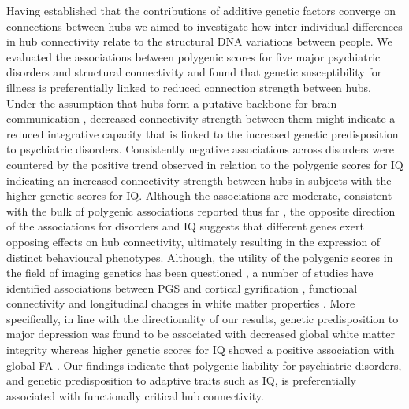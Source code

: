 Having established that the contributions of additive genetic factors converge on connections between hubs we aimed to investigate how inter-individual differences in hub connectivity relate to the structural DNA variations between people. We evaluated the associations between polygenic scores for five major psychiatric disorders and structural connectivity and found that genetic susceptibility for illness is preferentially linked to reduced connection strength between hubs. Under the assumption that hubs form a putative backbone for brain communication \citep{Harriger2012,Towlson2013,VandenHeuvel2011,VandenHeuvel2013b}, decreased connectivity strength between them might indicate a reduced integrative capacity that is linked to the increased genetic predisposition to psychiatric disorders. Consistently negative associations across disorders were countered by the positive trend observed in relation to the polygenic scores for IQ indicating an increased connectivity strength between hubs in subjects with the higher genetic scores for IQ. Although the associations are moderate, consistent with the bulk of polygenic associations reported thus far \citep{Alloza2018,Dezhina2018,Liu2016a,Sadeh2018,Wang2017}, the opposite direction of the associations for disorders and IQ suggests that different genes exert opposing effects on hub connectivity, ultimately resulting in the expression of distinct behavioural phenotypes. Although, the utility of the polygenic scores in the field of imaging genetics has been questioned \citep{Reus2017}, a number of studies have identified associations between PGS and cortical gyrification \citep{Liu2016a}, functional connectivity \citep{Dezhina2018,Sadeh2018,Wang2017} and longitudinal changes in white matter properties \citep{Alloza2018}. More specifically, in line with the directionality of our results, genetic predisposition to major depression was found to be associated with decreased global white matter integrity \citep{Whalley2013} whereas higher genetic scores for IQ showed a positive association with global FA \citep{Jansen2018}. Our findings indicate that polygenic liability for psychiatric disorders, and genetic predisposition to adaptive traits such as IQ, is preferentially associated with functionally critical hub connectivity.

